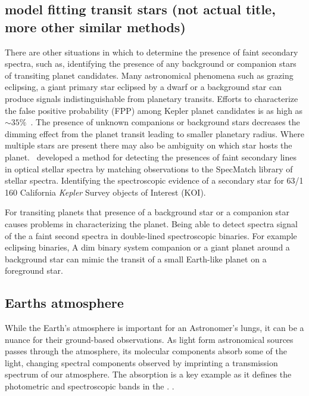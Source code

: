 \subsection{model fitting transit stars (not actual title, more other similar methods)}
There are other situations in which to determine the presence of faint secondary spectra, such as, identifying the presence of any background or companion stars of transiting planet candidates. Many astronomical phenomena such as grazing eclipsing, a giant primary star eclipsed by a dwarf or a background star can produce signals indistinguishable from planetary transits. Efforts to characterize the false positive probability (FPP) among Kepler planet candidates is as high as $\sim35\%$~\citep{santerne_sophie_2012}. The presence of unknown companions or background stars decreases the dimming effect from the planet transit leading to smaller planetary radius. Where multiple stars are present there may also be ambiguity on which star hosts the planet.~\citet{kolbl_detection_2015} developed a method for detecting the presences of faint secondary lines in optical stellar spectra by matching observations to the SpecMatch library of stellar spectra. Identifying the spectroscopic evidence of a secondary star for 63/1\,160 California \emph{Kepler} Survey objects of Interest (KOI).


For transiting planets that presence of a background star or a companion star causes problems in characterizing the planet. Being able to detect spectra signal of the a faint second spectra in double-lined spectroscopic binaries.
For example eclipsing binaries,
A dim binary system companion or a giant planet around a background star can mimic the transit of a small Earth-like planet on a foreground star.






\subsection{Earths atmosphere}
While the Earth's atmosphere is important for an Astronomer's lungs, it can be a nuance for their ground-based observations. As light form astronomical sources passes through the atmosphere, its molecular components absorb some of the light, changing spectral components observed by imprinting a transmission spectrum of our atmosphere. The  absorption is a key example as it defines the photometric and spectroscopic bands in the \nir{}. .


